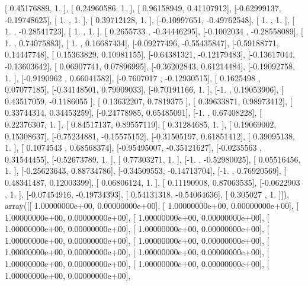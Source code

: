 \documentclass{article}
\begin{document}
       [ 0.45176889,  1.        ],
       [ 0.24960586,  1.        ],
       [ 0.96158949,  0.41107912],
       [-0.62999137, -0.19748625],
       [ 1.        ,  1.        ],
       [ 0.39712128,  1.        ],
       [-0.10997651, -0.49762548],
       [ 1.        ,  1.        ],
       [ 1.        , -0.28541723],
       [ 1.        ,  1.        ],
       [ 0.2655733 , -0.34446295],
       [-0.1002034 , -0.28558089],
       [ 1.        ,  0.74075883],
       [ 1.        ,  0.16687434],
       [-0.09277496, -0.55435847],
       [-0.59188771,  0.14447748],
       [ 0.15363829,  0.10981155],
       [-0.64381321, -0.12179483],
       [-0.13617044, -0.13603642],
       [ 0.06907741,  0.07896995],
       [-0.36202843,  0.61214484],
       [-0.19092758,  1.        ],
       [-0.9190962 ,  0.66041582],
       [-0.7607017 , -0.12930515],
       [ 0.1625498 ,  0.07077185],
       [-0.34148501,  0.79909033],
       [-0.70191166,  1.        ],
       [-1.        ,  0.19053906],
       [ 0.43517059, -0.1186055 ],
       [ 0.13632207,  0.7819375 ],
       [ 0.39633871,  0.98973412],
       [ 0.33744314,  0.34453259],
       [-0.24778985,  0.65485091],
       [-1.        ,  0.67408228],
       [ 0.22376307,  1.        ],
       [ 0.84517137,  0.89557119],
       [ 0.31284685,  1.        ],
       [ 0.19069002,  0.15308637],
       [-0.75234881, -0.15575152],
       [-0.31505197,  0.61851412],
       [ 0.39095138,  1.        ],
       [ 0.1074543 ,  0.68568374],
       [-0.95495007, -0.35121627],
       [-0.0235563 ,  0.31544455],
       [-0.52673789,  1.        ],
       [ 0.77303271,  1.        ],
       [-1.        , -0.52980025],
       [ 0.05516456,  1.        ],
       [-0.25623643,  0.88734786],
       [-0.34509553, -0.14713704],
       [-1.        ,  0.76920569],
       [ 0.48341487,  0.12003399],
       [ 0.06806124,  1.        ],
       [ 0.11190908,  0.87063535],
       [-0.0622903 ,  1.        ],
       [-0.07454916, -0.19734393],
       [ 0.54131318, -0.54064636],
       [ 0.305027  ,  1.        ]]), array([[  1.00000000e+00,   0.00000000e+00],
       [  1.00000000e+00,   0.00000000e+00],
       [  1.00000000e+00,   0.00000000e+00],
       [  1.00000000e+00,   0.00000000e+00],
       [  1.00000000e+00,   0.00000000e+00],
       [  1.00000000e+00,   0.00000000e+00],
       [  1.00000000e+00,   0.00000000e+00],
       [  1.00000000e+00,   0.00000000e+00],
       [  1.00000000e+00,   0.00000000e+00],
       [  1.00000000e+00,   0.00000000e+00],
       [  1.00000000e+00,   0.00000000e+00],
       [  1.00000000e+00,   0.00000000e+00],
       [  1.00000000e+00,   0.00000000e+00],
\end{document}
